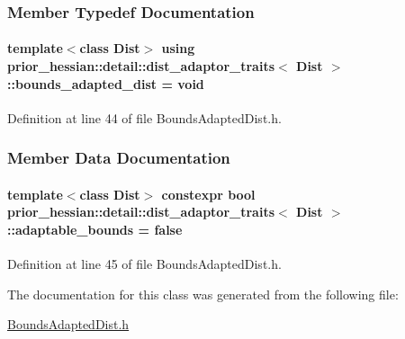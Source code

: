 \subsubsection{Member Typedef Documentation}
\paragraph[{\texorpdfstring{bounds\+\_\+adapted\+\_\+dist}{bounds_adapted_dist}}]{\setlength{\rightskip}{0pt plus 5cm}template$<$class Dist$>$ using {\bf prior\+\_\+hessian\+::detail\+::dist\+\_\+adaptor\+\_\+traits}$<$ Dist $>$\+::{\bf bounds\+\_\+adapted\+\_\+dist} =  void}\hypertarget{classprior__hessian_1_1detail_1_1dist__adaptor__traits_aa85b497e4ada11fdb03efd9507388da1}{}\label{classprior__hessian_1_1detail_1_1dist__adaptor__traits_aa85b497e4ada11fdb03efd9507388da1}


Definition at line 44 of file Bounds\+Adapted\+Dist.\+h.



\subsubsection{Member Data Documentation}
\paragraph[{\texorpdfstring{adaptable\+\_\+bounds}{adaptable_bounds}}]{\setlength{\rightskip}{0pt plus 5cm}template$<$class Dist$>$ constexpr bool {\bf prior\+\_\+hessian\+::detail\+::dist\+\_\+adaptor\+\_\+traits}$<$ Dist $>$\+::adaptable\+\_\+bounds = false\hspace{0.3cm}{\ttfamily [static]}}\hypertarget{classprior__hessian_1_1detail_1_1dist__adaptor__traits_a81002efd56cd84ee09a839e72ec1d7c9}{}\label{classprior__hessian_1_1detail_1_1dist__adaptor__traits_a81002efd56cd84ee09a839e72ec1d7c9}


Definition at line 45 of file Bounds\+Adapted\+Dist.\+h.



The documentation for this class was generated from the following file\+:\begin{DoxyCompactItemize}
\item 
\hyperlink{BoundsAdaptedDist_8h}{Bounds\+Adapted\+Dist.\+h}\end{DoxyCompactItemize}
